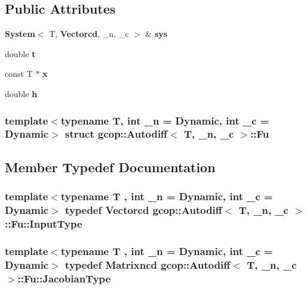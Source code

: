 \subsection*{\-Public \-Attributes}
\begin{DoxyCompactItemize}
\item 
{\bf \-System}$<$ \-T, {\bf \-Vectorcd}, \-\_\-n, \-\_\-c $>$ \& {\bf sys}
\item 
double {\bf t}
\item 
const \-T $\ast$ {\bf x}
\item 
double {\bf h}
\end{DoxyCompactItemize}
\subsubsection*{template$<$typename T, int \-\_\-n = \-Dynamic, int \-\_\-c = \-Dynamic$>$ struct gcop\-::\-Autodiff$<$ T, \-\_\-n, \-\_\-c $>$\-::\-Fu}



\subsection{\-Member \-Typedef \-Documentation}
\subsubsection[{\-Input\-Type}]{\setlength{\rightskip}{0pt plus 5cm}template$<$typename T , int \-\_\-n = \-Dynamic, int \-\_\-c = \-Dynamic$>$ typedef {\bf \-Vectorcd} {\bf gcop\-::\-Autodiff}$<$ \-T, \-\_\-n, \-\_\-c $>$\-::{\bf \-Fu\-::\-Input\-Type}}\label{structgcop_1_1Autodiff_1_1Fu_a482cb500161e914e283b5c7f656284e6}
\subsubsection[{\-Jacobian\-Type}]{\setlength{\rightskip}{0pt plus 5cm}template$<$typename T , int \-\_\-n = \-Dynamic, int \-\_\-c = \-Dynamic$>$ typedef {\bf \-Matrixncd} {\bf gcop\-::\-Autodiff}$<$ \-T, \-\_\-n, \-\_\-c $>$\-::{\bf \-Fu\-::\-Jacobian\-Type}}\label{structgcop_1_1Autodiff_1_1Fu_afb72e25ac417aaec70142b4f30e711c6}
